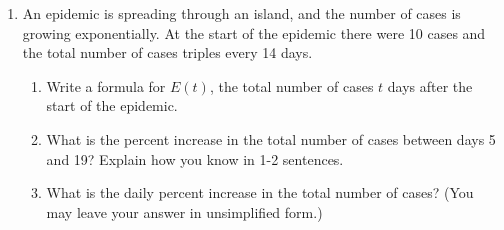 \documentclass{article}
\begin{document}
\begin{enumerate}

  \item An epidemic is spreading through an island, and the number of cases is growing exponentially. At the start of the epidemic there were 10 cases and the total number of cases triples every 14 days. 
    \begin{enumerate}
        \item \begin{problem}[\vfill]Write a formula for $E(t)$, the total number of cases $t$ days after the start of the epidemic.
        \end{problem}
        \item \begin{problem}[\vfill]What is the percent increase in the total number of cases between days 5 and 19? Explain how you know in 1-2 sentences. 
        \end{problem}
        \item \begin{problem}[\vfill]What is the daily percent increase in the total number of cases? (You may leave your answer in unsimplified form.)
        \end{problem}
        

\end{enumerate}
\end{enumerate}
\end{document}
